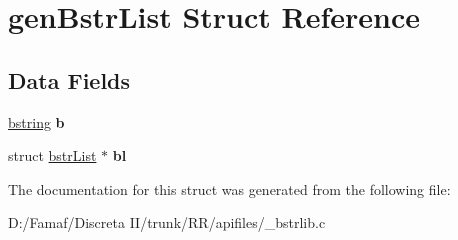 \hypertarget{structgen_bstr_list}{\section{gen\+Bstr\+List Struct Reference}
\label{structgen_bstr_list}
}
\subsection*{Data Fields}
\begin{DoxyCompactItemize}
\item 
\hypertarget{structgen_bstr_list_a3937d65c8996ccbc0a371bedb5e04c6e}{\hyperlink{structtagbstring}{bstring} {\bfseries b}}\label{structgen_bstr_list_a3937d65c8996ccbc0a371bedb5e04c6e}

\item 
\hypertarget{structgen_bstr_list_a454a2424aeed7b37231732a817d4296f}{struct \hyperlink{structbstr_list}{bstr\+List} $\ast$ {\bfseries bl}}\label{structgen_bstr_list_a454a2424aeed7b37231732a817d4296f}

\end{DoxyCompactItemize}


The documentation for this struct was generated from the following file\+:\begin{DoxyCompactItemize}
\item 
D\+:/\+Famaf/\+Discreta I\+I/trunk/\+R\+R/apifiles/\+\_\+bstrlib.\+c\end{DoxyCompactItemize}
